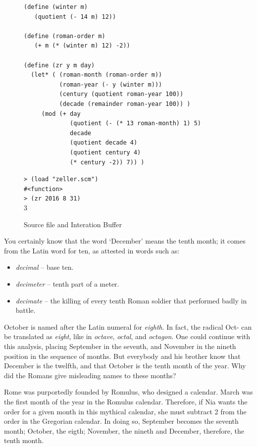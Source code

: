 \documentclass[a4paper,12pt]{book}
\newenvironment{fmpage}[1]
               {\begin{lrbox}{\fmbox}\begin{minipage}{#1}}
               {\end{minipage}\end{lrbox}\fbox{\usebox{\fmbox}}}
\begin{document}
\begin{figure}[!b]
\begin{fmpage}{0.9\linewidth}
\begin{verbatim}
(define (winter m)
   (quotient (- 14 m) 12))

(define (roman-order m)
   (+ m (* (winter m) 12) -2))

(define (zr y m day)
  (let* ( (roman-month (roman-order m))
          (roman-year (- y (winter m)))
          (century (quotient roman-year 100))
          (decade (remainder roman-year 100)) )
     (mod (+ day
             (quotient (- (* 13 roman-month) 1) 5)
             decade
             (quotient decade 4)
             (quotient century 4)
             (* century -2)) 7)) )
\end{verbatim}
\end{fmpage}

\begin{fmpage}{0.9\linewidth}
  \verb|> (load "zeller.scm")|\\
  \verb|#<function>|\\
  \verb|> (zr 2016 8 31)|\\
  3
\end{fmpage}
\caption{Source file and Interation Buffer}
\label{fig:date-calculation}
\end{figure}

You certainly know that the word `December' means
the tenth month; it comes from the Latin word for
ten, as attested in words such as:
\begin{itemize}
\item {\em decimal} -- base ten.
\item {\em decimeter} -- tenth part of a meter.
\item {\em decimate} -- the killing of every tenth
Roman soldier that performed badly in battle.
\end{itemize}

October is named after the Latin numeral for {\em eighth}.
In fact, the radical {\sc Oct-} can be translated
as {\em eight}, like in
{\em octave}, {\em octal}, and {\em octagon}.
One could continue with this analysis,
placing September in the seventh,
and November in the nineth position
in the sequence of months.
But everybody and
his brother know that December is the
twelfth, and that
October is the tenth month of the
year. Why did the Romans give misleading
names to these months?

Rome was purportedly founded by Romulus,
who designed a calendar.
March was the first month of the year
in the Romulus calendar. Therefore, if Nia
wants the order for a given month in
this mythical calendar, she must
subtract 2 from the order
in the Gregorian calendar.
In doing so, September becomes the
seventh month; October, the eigth;
November, the nineth and
December, therefore, the tenth month.
\end{document}
